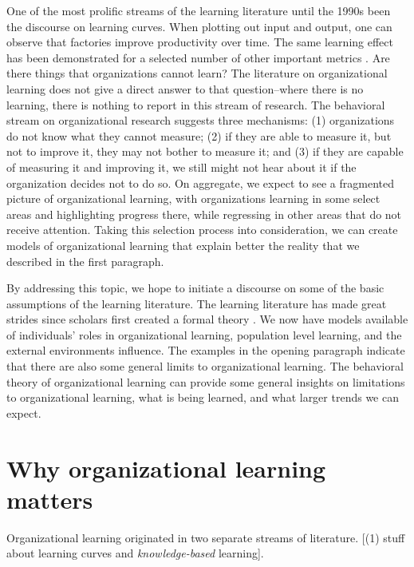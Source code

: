 \documentclass[12pt, man, natbib]{apa6}
\begin{document}
	One of the most prolific streams of the learning literature until the 1990s been the discourse on learning curves. When plotting out input and output, one can observe that factories improve productivity over time. The same learning effect has been demonstrated for a selected number of other important metrics \citep{Argote2013a}. Are there things that organizations cannot learn? The literature on organizational learning does not give a direct answer to that question--where there is no learning, there is nothing to report in this stream of research. The behavioral stream on organizational research suggests three mechanisms: (1) organizations do not know what they cannot measure; (2) if they are able to measure it, but not to improve it, they may not bother to measure it; and (3) if they are capable of measuring it and improving it, we still might not hear about it if the organization decides not to do so. On aggregate, we expect to see a fragmented picture of organizational learning, with organizations learning in some select areas and highlighting progress there, while regressing in other areas that do not receive attention. Taking this selection process into consideration, we can create models of organizational learning that explain better the reality that we described in the first paragraph.
	
	By addressing this topic, we hope to initiate a discourse on some of the basic assumptions of the learning literature. The learning literature has made great strides since scholars first created a formal theory \citep{March1963}. We now have models available of individuals' roles in organizational learning, population level learning, and the external environments influence. The examples in the opening paragraph indicate that there are also some general limits to organizational learning. The behavioral theory of organizational learning can provide some general insights on limitations to organizational learning, what is being learned, and what larger trends we can expect.
	
	\section{Why organizational learning matters}
	
	Organizational learning originated in two separate streams of literature. [(1) stuff about learning curves and \textit{knowledge-based} learning].
	
\end{document}
